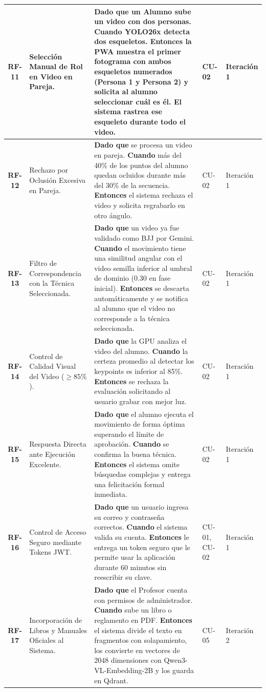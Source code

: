 \documentclass[12pt,letterpaper]{article}
\begin{document}
\begin{xltabular}{\textwidth}{|c|>{\raggedright\arraybackslash}p{0.22\textwidth}|>{\raggedright\arraybackslash}X|>{\centering\arraybackslash}p{0.12\textwidth}|>{\centering\arraybackslash}p{0.1\textwidth}|}
    \textbf{RF-11} & Selección Manual de Rol en Video en Pareja. & \textbf{Dado que} un Alumno sube un video con dos personas. \textbf{Cuando} YOLO26x detecta dos esqueletos. \textbf{Entonces} la PWA muestra el primer fotograma con ambos esqueletos numerados (Persona 1 y Persona 2) y solicita al alumno seleccionar cuál es él. El sistema rastrea ese esqueleto durante todo el video. & CU-02 & Iteración 1 \\ \hline
    \textbf{RF-12} & Rechazo por Oclusión Excesiva en Pareja. & \textbf{Dado que} se procesa un video en pareja. \textbf{Cuando} más del 40\% de los puntos del alumno quedan ocluidos durante más del 30\% de la secuencia. \textbf{Entonces} el sistema rechaza el video y solicita regrabarlo en otro ángulo. & CU-02 & Iteración 1 \\ \hline
    \textbf{RF-13} & Filtro de Correspondencia con la Técnica Seleccionada. & \textbf{Dado que} un video ya fue validado como BJJ por Gemini. \textbf{Cuando} el movimiento tiene una similitud angular con el video semilla inferior al umbral de dominio (0.30 en fase inicial). \textbf{Entonces} se descarta automáticamente y se notifica al alumno que el video no corresponde a la técnica seleccionada. & CU-02 & Iteración 1 \\ \hline
    \textbf{RF-14} & Control de Calidad Visual del Video ($\ge 85\%$). & \textbf{Dado que} la GPU analiza el video del alumno. \textbf{Cuando} la certeza promedio al detectar los keypoints es inferior al 85\%. \textbf{Entonces} se rechaza la evaluación solicitando al usuario grabar con mejor luz. & CU-02 & Iteración 1 \\ \hline
    \textbf{RF-15} & Respuesta Directa ante Ejecución Excelente. & \textbf{Dado que} el alumno ejecuta el movimiento de forma óptima superando el límite de aprobación. \textbf{Cuando} se confirma la buena técnica. \textbf{Entonces} el sistema omite búsquedas complejas y entrega una felicitación formal inmediata. & CU-02 & Iteración 1 \\ \hline
    \textbf{RF-16} & Control de Acceso Seguro mediante Tokens JWT. & \textbf{Dado que} un usuario ingresa su correo y contraseña correctos. \textbf{Cuando} el sistema valida su cuenta. \textbf{Entonces} le entrega un token seguro que le permite usar la aplicación durante 60 minutos sin reescribir su clave. & CU-01, CU-02 & Iteración 1 \\ \hline
    \textbf{RF-17} & Incorporación de Libros y Manuales Oficiales al Sistema. & \textbf{Dado que} el Profesor cuenta con permisos de administrador. \textbf{Cuando} sube un libro o reglamento en PDF. \textbf{Entonces} el sistema divide el texto en fragmentos con solapamiento, los convierte en vectores de 2048 dimensiones con Qwen3-VL-Embedding-2B y los guarda en Qdrant. & CU-05 & Iteración 2 \\ \hline

\end{xltabular}
\end{document}
